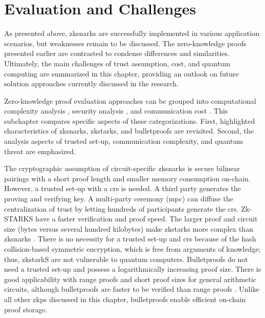 \section{Evaluation and Challenges}
As presented above, \acrshort{zksnark}s are successfully implemented in various application scenarios, but weaknesses remain to be discussed. The zero-knowledge proofs presented earlier are contrasted to condense differences and similarities. Ultimately, the main challenges of trust assumption, cost, and quantum computing are summarized in this chapter, providing an outlook on future solution approaches currently discussed in the research.

Zero-knowledge proof evaluation approaches can be grouped into computational complexity analysis \citep{LiuWangPengXing, SONIC10.1145/3319535.3339817, PipeZK}, security analysis \citep{Huangetal}, and communication cost \citep{ZHENG, liuetal, gongetal}. This subchapter compares specific aspects of these categorizations. First, highlighted characteristics of \acrshort{zksnark}s, \acrshort{zkstark}s, and bulletproofs are revisited. Second, the analysis aspects of trusted set-up, communication complexity, and quantum threat are emphasized. 

The cryptographic assumption of circuit-specific \acrshort{zksnark}s is secure bilinear pairings with a short proof length and smaller memory consumption on-chain. However, a trusted set-up with a \acrshort{crs} is needed. A third party generates the proving and verifying key. A multi-party ceremony (\acrshort{mpc}) can diffuse the centralization of trust by letting hundreds of participants generate the \acrshort{crs}. Zk-STARKS have a faster verification and proof speed. The larger proof and circuit size (bytes versus several hundred kilobytes) make \acrshort{zkstark}s more complex than \acrshort{zksnark}s \citep{liuetal}. There is no necessity for a trusted set-up and \acrshort{crs} because of the hash collision-based symmetric encryption, which is free from arguments of knowledge; thus, \acrshort{zkstark}S are not vulnerable to quantum computers. Bulletproofs do not need a trusted set-up and possess a logarithmically increasing proof size. There is good applicability with range proofs and short proof sizes for general arithmetic circuits, although bulletproofs are faster to be verified than range proofs \citep{gongetal}. Unlike all other \acrshort{zkp}s discussed in this chapter, bulletproofs enable efficient on-chain proof storage. 

